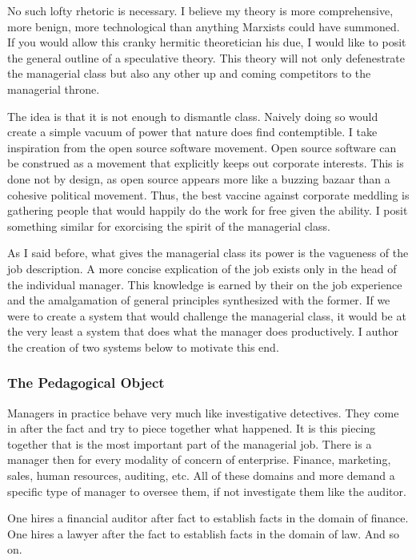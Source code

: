 \documentclass[12pt]{article}
\begin{document}
No such lofty rhetoric is necessary.
I believe my theory is more comprehensive, more benign, more technological than anything Marxists could have summoned.
If you would allow this cranky hermitic theoretician his due, I would like to posit the general outline of a speculative theory.
This theory will not only defenestrate the managerial class but also any other up and coming competitors to the managerial throne.

The idea is that it is not enough to dismantle class.
Naively doing so would create a simple vacuum of power that nature does find contemptible.
I take inspiration from the open source software movement.
Open source software can be construed as a movement that explicitly keeps out corporate interests.
This is done not by design, as open source appears more like a buzzing bazaar than a cohesive political movement.
Thus, the best vaccine against corporate meddling is gathering people that would happily do the work for free given the ability.
I posit something similar for exorcising the spirit of the managerial class.

As I said before, what gives the managerial class its power is the vagueness of the job description.
A more concise explication of the job exists only in the head of the individual manager.
This knowledge is earned by their on the job experience and the amalgamation of general principles synthesized with the former.
If we were to create a system that would challenge the managerial class, it would be at the very least a system that does what the manager does productively.
I author the creation of two systems below to motivate this end.

\subsubsection{The Pedagogical Object}
Managers in practice behave very much like investigative detectives.
They come in after the fact and try to piece together what happened.
It is this piecing together that is the most important part of the managerial job.
There is a manager then for every modality of concern of enterprise.
Finance, marketing, sales, human resources, auditing, etc.
All of these domains and more demand a specific type of manager to oversee them, if not investigate them like the auditor.

One hires a financial auditor after fact to establish facts in the domain of finance.
One hires a lawyer after the fact to establish facts in the domain of law.
And so on.
\end{document}
